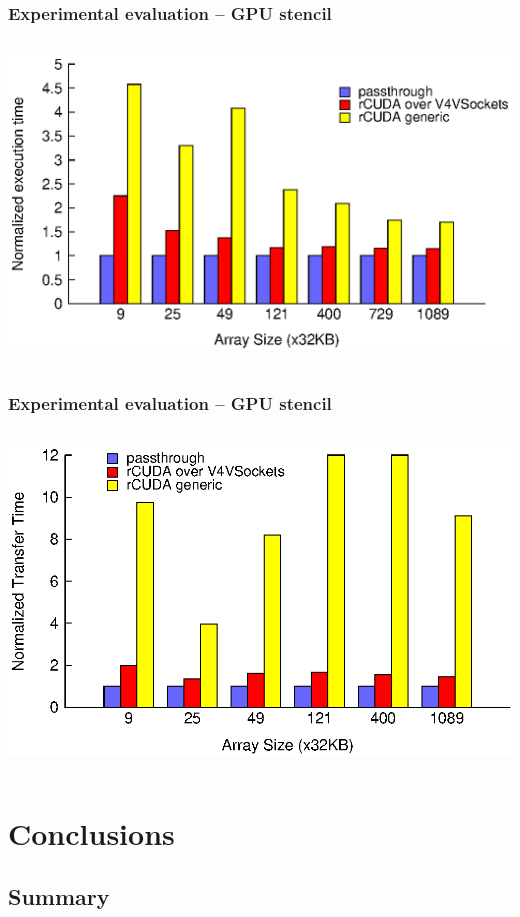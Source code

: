 \documentclass[red,slidestop,notes,compress,mathserif]{beamer}
\begin{document}
\begin{frame}
\frametitle{Experimental evaluation -- GPU stencil}
\begin{columns}
\includegraphics[width=\textwidth]{figures/total_cublas_time.eps}
\end{columns}
\end{frame}

\begin{frame}
\frametitle{Experimental evaluation -- GPU stencil}
\begin{columns}
\includegraphics[width=\textwidth]{figures/matrixA_cublas_throughput.eps}
\end{columns}
\end{frame}

\section*{Conclusions}

\subsection*{Summary}
\end{document}
